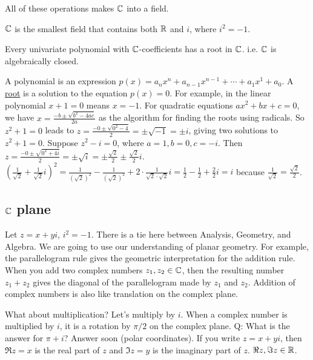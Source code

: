 \documentclass[]{article}
\begin{document}
All of these operations makes $\mathbb{C}$ into a field.
\begin{note}
	$\mathbb{C}$ is the smallest field that contains both $\mathbb{R}$ and $i$, where $i^2=-1$.
\end{note}
\begin{theorem}
	 Every univariate polynomial with $\mathbb{C}$-coefficients has a root in $\mathbb{C}$. i.e. $\mathbb{C}$ is algebraically closed.
\end{theorem}
A polynomial is an expression $p(x)=a_n x^n+ a_{n-1} x^{n-1} + \cdots + a_1 x^1 + a_0$. A \underline{root} is a solution to the equation $p(x)=0$. For example, in the linear polynomial $x+1=0$ means $x=-1$. For quadratic equations $ax^2+bx+c=0$, we have $x=\frac{-b\pm \sqrt{b^2-4ac}}{2a}$ as the algorithm for finding the roots using radicals. So $z^2+1=0$ leads to $z=\frac{-0\pm\sqrt{0^2-4}}{2}=\pm\sqrt{-1}=\pm i$, giving two solutions to $z^2+1=0$. Suppose $z^2-i=0$, where $a=1,b=0,c=-i$. Then $z=\frac{-0\pm\sqrt{0^2+4i}}{2}=\pm\sqrt{i}=\pm\frac{\sqrt{2}}{2}\pm\frac{\sqrt{2}}{2}i$. $(\frac{1}{\sqrt{2}}+\frac{1}{\sqrt{2}}i)^2=\frac{1}{(\sqrt{2})^2}-\frac{1}{(\sqrt{2})^2}+2\cdot\frac{1}{\sqrt{2}\cdot\sqrt{2}}i=\frac{1}{2}-\frac{1}{2}+\frac{2}{2}i=i$ because $\frac{1}{\sqrt{2}}=\frac{\sqrt{2}}{2}$.

\subsection{$\mathbb{C}$ plane}
Let $z=x+yi$, $i^2=-1$. There is a tie here between Analysis, Geometry, and Algebra. We are going to use our understanding of planar geometry. For example, the parallelogram rule gives the geometric interpretation for the addition rule. When you add two complex numbers $z_1,z_2\in\mathbb{C}$, then the resulting number $z_1+z_2$ gives the diagonal of the parallelogram made by $z_1$ and $z_2$. Addition of complex numbers is also like translation on the complex plane.

What about multiplication? Let's multiply by $i$. When a complex number is multiplied by $i$, it is a rotation by $\pi/2$ on the complex plane. Q: What is the answer for $\pi+i$? Answer soon (polar coordinates). If you write $z=x+yi$, then $\Re{z}=x$ is the real part of $z$ and $\Im{z}=y$ is the imaginary part of $z$. $\Re{z},\Im{z}\in\mathbb{R}$.
\end{document}
